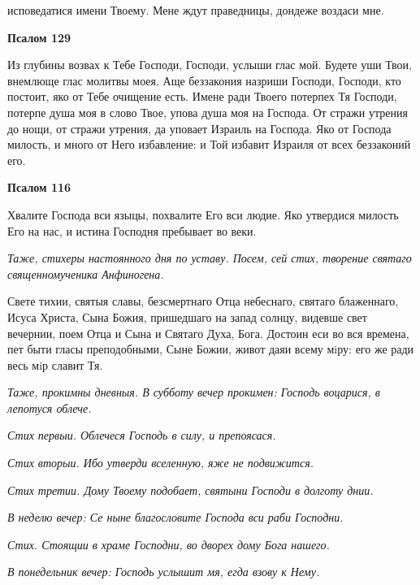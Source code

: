 исповедатися имени Твоему. Мене ждут праведницы, дондеже воздаси
мне.






 

\bfseries Псалом 129\normalfont{}


   Из глубины возвах к Тебе Господи, Господи, услыши глас мой. Будете
уши Твои, внемлюще глас молитвы моея. Аще беззакония назриши
Господи, Господи, кто постоит, яко от Тебе очищение есть. Имене
ради Твоего потерпех Тя Господи, потерпе душа моя в слово Твое,
упова душа моя на Господа. От стражи утрения до нощи, от стражи
утрения, да уповает Израиль на Господа. Яко от Господа милость, и
много от Него избавление: и Той избавит Израиля от всех беззаконий
его.






 

\bfseries Псалом 116\normalfont{}


   Хвалите Господа вси языцы, похвалите Его вси людие. Яко утвердися
милость Его на нас, и истина Господня пребывает во веки.


 \itshape Таже, стихеры настоянного дня по уставу. Посем, сей стих, творение
святаго священномученика Анфиногена.\normalfont{}


   Свете тихии, святыя славы, безсмертнаго Отца небеснаго, святаго
блаженнаго, Исуса Христа, Сына Божия, пришедшаго на запад солнцу,
видевше свет вечернии, поем Отца и Сына и Святаго Духа, Бога. Достоин
еси во вся времена, пет быти гласы преподобными, Сыне Божии, живот даяи
всему мiру: его же ради весь мiр славит Тя.


 \itshape Таже, прокимны дневныя. В субботу вечер прокимен:\normalfont{} Господь воцарися,
в лепотуся облече.


 \itshape Стих первыи.\normalfont{} Облечеся Господь в силу, и препоясася.


 \itshape Стих вторыи.\normalfont{} Ибо утверди вселенную, яже не подвижится.


 \itshape Стих третии.\normalfont{} Дому Твоему подобает, святыни Господи в долготу
днии.


 \itshape В неделю вечер:\normalfont{} Се ныне благословите Господа вси раби Господни.


 \itshape Стих.\normalfont{} Стоящии в храме Господни, во дворех дому Бога нашего.


 \itshape В понедельник вечер:\normalfont{} Господь услышит мя, егда взову к Нему.


